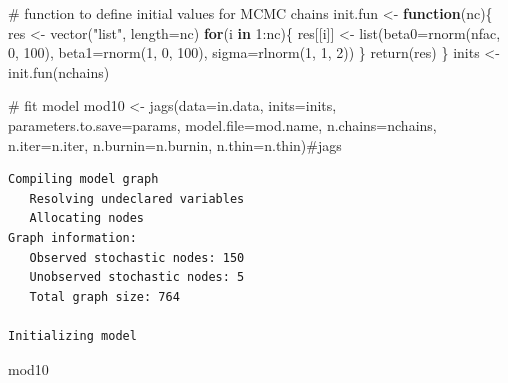 \documentclass[
  13,
  letterpaper,
]{report}
\newenvironment{Shaded}{\begin{snugshade}}{\end{snugshade}}
\newcommand{\AttributeTok}[1]{\textcolor[rgb]{0.40,0.45,0.13}{#1}}
\newcommand{\CommentTok}[1]{\textcolor[rgb]{0.37,0.37,0.37}{#1}}
\newcommand{\ControlFlowTok}[1]{\textcolor[rgb]{0.00,0.23,0.31}{\textbf{#1}}}
\newcommand{\DecValTok}[1]{\textcolor[rgb]{0.68,0.00,0.00}{#1}}
\newcommand{\FunctionTok}[1]{\textcolor[rgb]{0.28,0.35,0.67}{#1}}
\newcommand{\NormalTok}[1]{\textcolor[rgb]{0.00,0.23,0.31}{#1}}
\newcommand{\OtherTok}[1]{\textcolor[rgb]{0.00,0.23,0.31}{#1}}
\newcommand{\SpecialCharTok}[1]{\textcolor[rgb]{0.37,0.37,0.37}{#1}}
\newcommand{\StringTok}[1]{\textcolor[rgb]{0.13,0.47,0.30}{#1}}
\begin{document}
\begin{Shaded}
\begin{Highlighting}[]
\CommentTok{\# function to define initial values for MCMC chains}
\NormalTok{init.fun }\OtherTok{\textless{}{-}} \ControlFlowTok{function}\NormalTok{(nc)\{}
\NormalTok{    res }\OtherTok{\textless{}{-}} \FunctionTok{vector}\NormalTok{(}\StringTok{"list"}\NormalTok{, }\AttributeTok{length=}\NormalTok{nc)}
    \ControlFlowTok{for}\NormalTok{(i }\ControlFlowTok{in} \DecValTok{1}\SpecialCharTok{:}\NormalTok{nc)\{}
\NormalTok{        res[[i]] }\OtherTok{\textless{}{-}} \FunctionTok{list}\NormalTok{(}\AttributeTok{beta0=}\FunctionTok{rnorm}\NormalTok{(nfac, }\DecValTok{0}\NormalTok{, }\DecValTok{100}\NormalTok{),}
                         \AttributeTok{beta1=}\FunctionTok{rnorm}\NormalTok{(}\DecValTok{1}\NormalTok{, }\DecValTok{0}\NormalTok{, }\DecValTok{100}\NormalTok{),}
                         \AttributeTok{sigma=}\FunctionTok{rlnorm}\NormalTok{(}\DecValTok{1}\NormalTok{, }\DecValTok{1}\NormalTok{, }\DecValTok{2}\NormalTok{))}
\NormalTok{    \}}
    \FunctionTok{return}\NormalTok{(res)}
\NormalTok{\}}
\NormalTok{inits }\OtherTok{\textless{}{-}} \FunctionTok{init.fun}\NormalTok{(nchains)}

\CommentTok{\# fit model}
\NormalTok{mod10 }\OtherTok{\textless{}{-}} \FunctionTok{jags}\NormalTok{(}\AttributeTok{data=}\NormalTok{in.data, }\AttributeTok{inits=}\NormalTok{inits,}
              \AttributeTok{parameters.to.save=}\NormalTok{params,}
              \AttributeTok{model.file=}\NormalTok{mod.name,}
              \AttributeTok{n.chains=}\NormalTok{nchains, }\AttributeTok{n.iter=}\NormalTok{n.iter,}
              \AttributeTok{n.burnin=}\NormalTok{n.burnin, }\AttributeTok{n.thin=}\NormalTok{n.thin)}\CommentTok{\#jags}
\end{Highlighting}
\end{Shaded}

\begin{verbatim}
Compiling model graph
   Resolving undeclared variables
   Allocating nodes
Graph information:
   Observed stochastic nodes: 150
   Unobserved stochastic nodes: 5
   Total graph size: 764

Initializing model
\end{verbatim}

\begin{Shaded}
\begin{Highlighting}[]
\NormalTok{mod10}
\end{Highlighting}
\end{Shaded}
\end{document}
